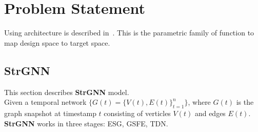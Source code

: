 \documentclass{article}
\begin{document}
\section{Problem Statement}
Using architecture is described in~\cite{DBLP:journals/corr/abs-2005-07427}. This is the parametric family of function to map design space to target space. 
\subsection{StrGNN}
This section describes \textbf{StrGNN} model.\\
Given a temporal network $\{G(t) = \{V(t), E(t)\}^n_{t=1}\}$, where $G(t)$ is the graph snapshot at timestamp $t$ consisting of verticles $V(t)$ and edges $E(t)$.\\
\textbf{StrGNN} works in three stages: ESG, GSFE, TDN.
\end{document}
